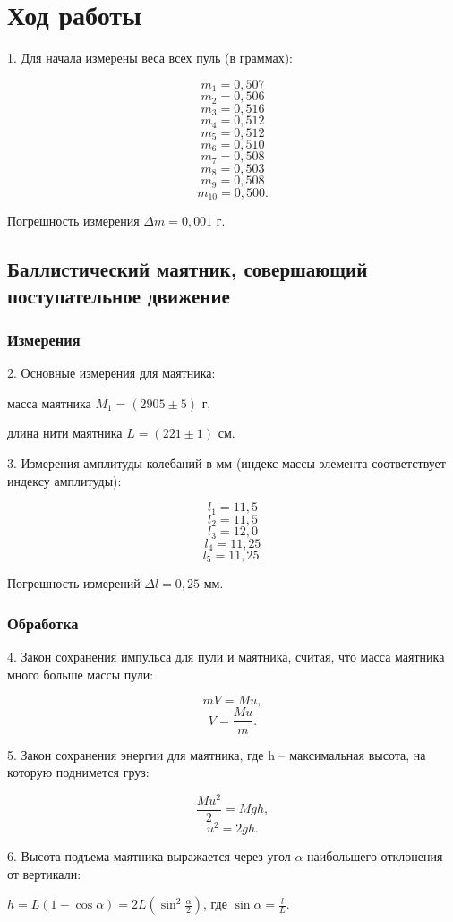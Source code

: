 \section{Ход работы}
1. Для начала измерены веса всех пуль (в граммах):

\[m_1 = 0,507\]
\[m_2 = 0,506\]
\[m_3 = 0,516\]
\[m_4 = 0,512\]
\[m_5 = 0,512\]
\[m_6 = 0,510\]
\[m_7 = 0,508\]
\[m_8 = 0,503\]
\[m_9 = 0,508\]
\[m_{10} = 0,500.\]

Погрешность измерения $\Delta m =0,001$ г.

\subsection{Баллистический маятник, совершающий поступательное движение}
\subsubsection{Измерения}

2. Основные измерения для маятника:

масса маятника $M_1 = \left(2905\pm5\right)$ г,

длина нити маятника $L = (221\pm1)$ см.

3. Измерения амплитуды колебаний в мм (индекс массы элемента
соответствует индексу амплитуды):

\[l_1 = 11,5\]
\[l_2 = 11,5\]
\[l_3 = 12,0\]
\[l_4 = 11,25\]
\[l_5 = 11,25.\]

Погрешность измерений $\Delta l = 0,25$ мм.

\subsubsection{Обработка}

4. Закон сохранения импульса для пули и маятника, считая, что
масса маятника много больше массы пули:

\[mV = Mu,\]
\[V=\frac{Mu}{m}.\]

5. Закон сохранения энергии для маятника, где h -- максимальная
высота, на которую поднимется груз:

 \[\frac{Mu^2}{2} = Mgh,\]
\[u^2 = 2gh.\]

6. Высота подъема маятника выражается через угол $\alpha$ наибольшего
отклонения от вертикали:
\begin{center}
    $h = L \left(1 - \cos{\alpha}\right) = 2L \left(\sin^2{\frac{\alpha}{2}}\right)$,
    где $\sin{\alpha} = \frac{l}{L}$.
\end{center}

